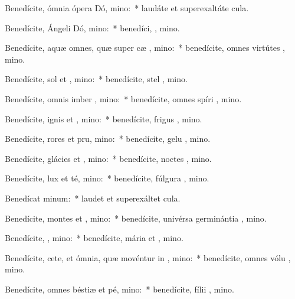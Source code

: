 \item Benedícite, ómnia ópera Dó, mino:~* laudáte et superexaltáte   cula.
\item Benedícite, Ángeli Dó, mino:~* benedíci, , mino.
\item Benedícite, aquæ omnes, quæ super cæ , mino:~* benedícite, omnes virtútes , mino.
\item Benedícite, sol et , mino:~* benedícite, stel , mino.
\item Benedícite, omnis imber  , mino:~* benedícite, omnes spíri , mino.
\item Benedícite, ignis et , mino:~* benedícite, frigus  , mino.
\item Benedícite, rores et pru, mino:~* benedícite, gelu  , mino.
\item Benedícite, glácies et , mino:~* benedícite, noctes  , mino.
\item Benedícite, lux et té, mino:~* benedícite, fúlgura  , mino.
\item Benedícat  minum:~* laudet et superexáltet   cula.
\item Benedícite, montes et , mino:~* benedícite, univérsa germinántia  , mino.
\item Benedícite, , mino:~* benedícite, mária et , mino.
\item Benedícite, cete, et ómnia, quæ movéntur in , mino:~* benedícite, omnes vólu , mino.
\item Benedícite, omnes béstiæ et pé, mino:~* benedícite, fílii , mino.
